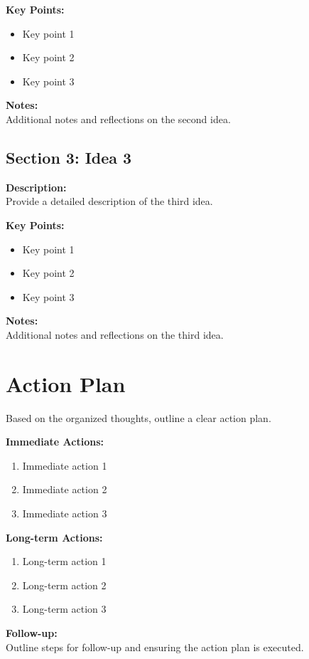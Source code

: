 \documentclass[a4paper, 12pt]{article}
\begin{document}
\noindent
\textbf{Key Points:}
\begin{itemize}
    \item Key point 1
    \item Key point 2
    \item Key point 3
\end{itemize}

\vspace{0.5cm}

\noindent
\textbf{Notes:} \\
Additional notes and reflections on the second idea.

\vspace{1cm}

\subsection*{Section 3: Idea 3}
\noindent
\textbf{Description:} \\
Provide a detailed description of the third idea.

\vspace{0.5cm}

\noindent
\textbf{Key Points:}
\begin{itemize}
    \item Key point 1
    \item Key point 2
    \item Key point 3
\end{itemize}

\vspace{0.5cm}

\noindent
\textbf{Notes:} \\
Additional notes and reflections on the third idea.

\vspace{1cm}

\section*{Action Plan}
\noindent
Based on the organized thoughts, outline a clear action plan.

\vspace{0.5cm}

\noindent
\textbf{Immediate Actions:}
\begin{enumerate}
    \item Immediate action 1
    \item Immediate action 2
    \item Immediate action 3
\end{enumerate}

\vspace{0.5cm}

\noindent
\textbf{Long-term Actions:}
\begin{enumerate}
    \item Long-term action 1
    \item Long-term action 2
    \item Long-term action 3
\end{enumerate}

\vspace{0.5cm}

\noindent
\textbf{Follow-up:} \\
Outline steps for follow-up and ensuring the action plan is executed.
\end{document}
